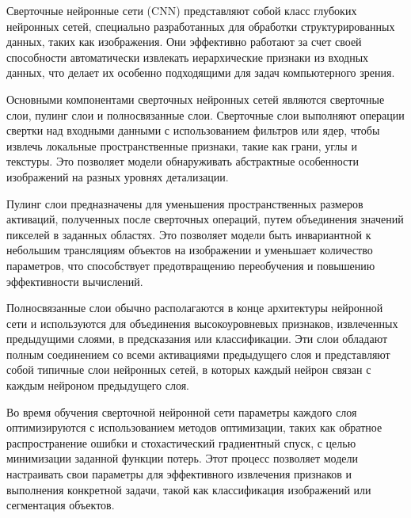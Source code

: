 Сверточные нейронные сети (CNN) представляют собой класс глубоких нейронных сетей, специально разработанных для обработки структурированных данных, таких как изображения. Они эффективно работают за счет своей способности автоматически извлекать иерархические признаки из входных данных, что делает их особенно подходящими для задач компьютерного зрения.

Основными компонентами сверточных нейронных сетей являются сверточные слои, пулинг слои и полносвязанные слои. Сверточные слои выполняют операции свертки над входными данными с использованием фильтров или ядер, чтобы извлечь локальные пространственные признаки, такие как грани, углы и текстуры. Это позволяет модели обнаруживать абстрактные особенности изображений на разных уровнях детализации.

Пулинг слои предназначены для уменьшения пространственных размеров активаций, полученных после сверточных операций, путем объединения значений пикселей в заданных областях. Это позволяет модели быть инвариантной к небольшим трансляциям объектов на изображении и уменьшает количество параметров, что способствует предотвращению переобучения и повышению эффективности вычислений.

Полносвязанные слои обычно располагаются в конце архитектуры нейронной сети и используются для объединения высокоуровневых признаков, извлеченных предыдущими слоями, в предсказания или классификации. Эти слои обладают полным соединением со всеми активациями предыдущего слоя и представляют собой типичные слои нейронных сетей, в которых каждый нейрон связан с каждым нейроном предыдущего слоя.

Во время обучения сверточной нейронной сети параметры каждого слоя оптимизируются с использованием методов оптимизации, таких как обратное распространение ошибки и стохастический градиентный спуск, с целью минимизации заданной функции потерь. Этот процесс позволяет модели настраивать свои параметры для эффективного извлечения признаков и выполнения конкретной задачи, такой как классификация изображений или сегментация объектов.
